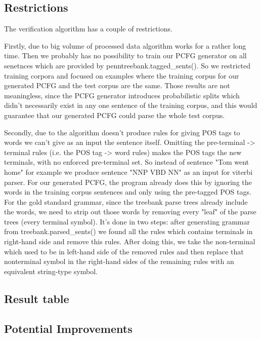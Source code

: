 \documentclass[paper=a4, fontsize=11pt]{scrartcl} %
\numberwithin{equation}{section} %
\numberwithin{figure}{section} %
\numberwithin{table}{section} %
\begin{document}
\subsection{Restrictions}
The verification algorithm has a couple of restrictions. 

Firstly, due to big volume of processed data algorithm works for a rather long time. Then we probably has no possibility to train our PCFG generator on all senetnces which are provided by penntreebank.tagged_sents(). So we restricted training corpora and focused on examples where the training corpus for our generated PCFG and the test corpus are the same. Those results are not meaningless, since the PCFG generator introduces probabilistic splits which didn't necessarily exist in any one sentence of the training corpus, and this would guarantee that our generated PCFG could parse the whole test corpus. 

Secondly, due to the algorithm doesn't produce rules for giving POS tags to words we can't give as an input the sentence itself. Omitting the pre-terminal -> terminal rules (i.e. the POS tag -> word rules) makes the POS tags the new terminals, with no enforced pre-terminal set. So instead of sentence "Tom went home" for example we produce sentence "NNP VBD NN" as an input for viterbi parser.
For our generated PCFG, the program already does this by ignoring the words in the training corpus sentences and only using the pre-tagged POS tags. 
For the gold standard grammar, since the treebank parse trees already include the words, we need to strip out those words by removing every "leaf" of the parse trees (every terminal symbol). It's done in two steps: after generating grammar from treebank.parsed_sents() we found all the rules which contains terminals in right-hand side and remove this rules. After doing this, we take the non-terminal which used to be in left-hand side of the removed rules and  then replace that nonterminal symbol in the right-hand sides of the remaining rules with an equivalent string-type symbol.

\subsection{Result table}

\subsection{Potential Improvements}
\end{document}
